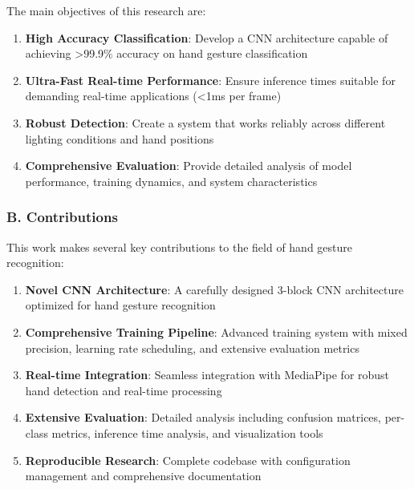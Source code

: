 \documentclass[11pt,a4paper,twoside]{article}
\begin{document}
The main objectives of this research are:

\begin{highlightbox}
\begin{enumerate}[label=\textbf{\arabic*.}, leftmargin=*]
\item \textbf{High Accuracy Classification}: Develop a CNN architecture
  capable of achieving >99.9\% accuracy on hand gesture
  classification
\item \textbf{Ultra-Fast Real-time Performance}: Ensure inference times
  suitable for demanding real-time applications (<1ms per frame)
\item \textbf{Robust Detection}: Create a system that works reliably across
  different lighting conditions and hand positions
\item \textbf{Comprehensive Evaluation}: Provide detailed analysis of model
  performance, training dynamics, and system characteristics
\end{enumerate}
\end{highlightbox}

\subsubsection{B. Contributions}

This work makes several key contributions to the field of hand gesture
recognition:

\begin{successbox}
\begin{enumerate}[label=\ding{51} \textbf{\arabic*.}, leftmargin=*]
\item \textbf{Novel CNN Architecture}: A carefully designed 3-block CNN
  architecture optimized for hand gesture recognition
\item \textbf{Comprehensive Training Pipeline}: Advanced training system
  with mixed precision, learning rate scheduling, and extensive
  evaluation metrics
\item \textbf{Real-time Integration}: Seamless integration with MediaPipe
  for robust hand detection and real-time processing
\item \textbf{Extensive Evaluation}: Detailed analysis including confusion
  matrices, per-class metrics, inference time analysis, and
  visualization tools
\item \textbf{Reproducible Research}: Complete codebase with configuration
  management and comprehensive documentation
\end{enumerate}
\end{successbox}
\end{document}
